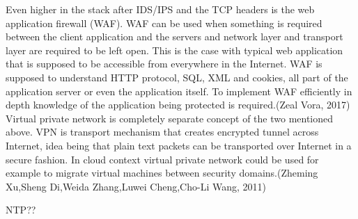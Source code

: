 \documentclass{article}
\begin{document}
\par
Even higher in the stack after IDS/IPS and the TCP headers is the web application firewall (WAF). WAF can be used when something is required between the client application and the servers and network layer and transport layer are required to be left open. This is the case with typical web application that is supposed to be accessible from everywhere in the Internet. WAF is supposed to understand HTTP protocol, SQL, XML and cookies, all part of the application server or even the application itself. To implement WAF efficiently in depth knowledge of the application being protected is required.(Zeal Vora, 2017) Virtual private network is completely separate concept of the two mentioned above. VPN is transport mechanism that creates encrypted tunnel across Internet, idea being that plain text packets can be transported over Internet in a secure fashion. In cloud context virtual private network could be used for example to migrate virtual machines between security domains.(Zheming Xu,Sheng Di,Weida Zhang,Luwei Cheng,Cho-Li Wang, 2011)
\par
NTP??
\end{document}

